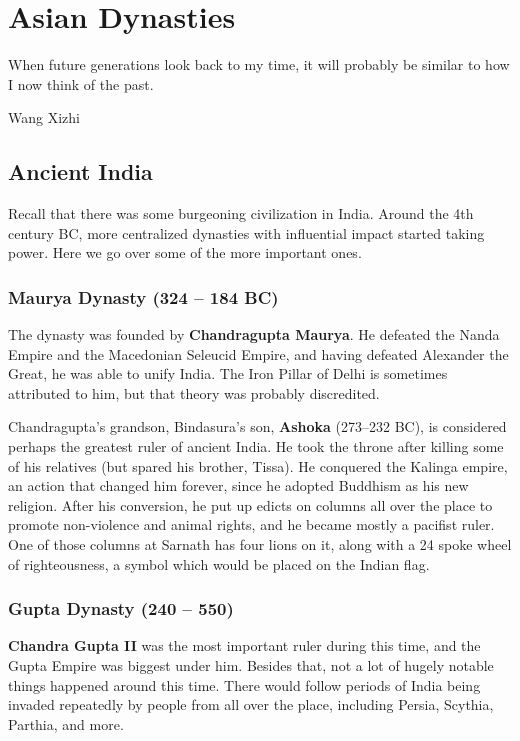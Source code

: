 \chapter{Asian Dynasties}

\epigraph{%
  When future generations look back to my time, it will probably be similar to how I now think of the past.
}{Wang Xizhi}

\section{Ancient India}

Recall that there was some burgeoning civilization in India.
Around the 4th century BC, more centralized dynasties with influential impact started taking power.
Here we go over some of the more important ones.

\subsection*{Maurya Dynasty (324 -- 184 BC)}

The dynasty was founded by \textbf{Chandragupta Maurya}.
He defeated the Nanda Empire and the Macedonian Seleucid Empire,
and having defeated Alexander the Great, he was able to unify India.
The Iron Pillar of Delhi is sometimes attributed to him, but that theory was probably discredited.

Chandragupta's grandson, Bindasura's son,
\textbf{Ashoka} (273--232 BC), is considered perhaps the greatest ruler of ancient India.
He took the throne after killing some of his relatives (but spared his brother, Tissa).
He conquered the Kalinga empire, an action that changed him forever,
since he adopted Buddhism as his new religion.
After his conversion,
he put up edicts on columns all over the place to promote non-violence and animal rights,
and he became mostly a pacifist ruler.
One of those columns at Sarnath has four lions on it,
along with a 24 spoke wheel of righteousness, a symbol which would be placed on the Indian flag.

\subsection*{Gupta Dynasty (240 -- 550)}

\textbf{Chandra Gupta II} was the most important ruler during this time,
and the Gupta Empire was biggest under him.
Besides that, not a lot of hugely notable things happened around this time.
There would follow periods of India being invaded repeatedly by people from
all over the place, including Persia, Scythia, Parthia, and more.

